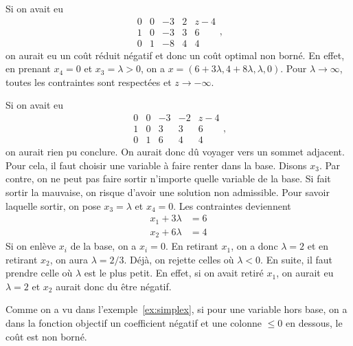 \begin{myexem}
  Si on avait eu
  \[
    \begin{array}{cccc|c}
      0 & 0 & -3 & 2 & z-4\\
      \hline
      1 & 0 & -3 & 3 & 6\\
      0 & 1 & -8 & 4 & 4
    \end{array},
  \]
  on aurait eu un coût réduit négatif et donc un coût optimal non borné.
  En effet, en prenant
  $x_4 = 0$ et $x_3 = \lambda > 0$, on a
  $x = (6 + 3\lambda, 4+8\lambda, \lambda, 0)$.
  Pour $\lambda \to \infty$, toutes les contraintes sont respectées et
  $z \to -\infty$.

  Si on avait eu
  \[
    \begin{array}{cccc|c}
      0 & 0 & -3 & -2 & z-4\\
      \hline
      1 & 0 & 3 & 3 & 6\\
      0 & 1 & 6 & 4 & 4
    \end{array},
  \]
  on aurait rien pu conclure.
  On aurait donc dû voyager vers un sommet adjacent.
  Pour cela, il faut choisir une variable à faire renter dans la base.
  Disons $x_3$.
  Par contre, on ne peut pas faire sortir n'importe quelle variable
  de la base.
  Si fait sortir la mauvaise, on risque d'avoir une solution non admissible.
  Pour savoir laquelle sortir, on pose $x_3 = \lambda$ et $x_4 = 0$.
  Les contraintes deviennent
  \begin{align*}
    x_1 + 3\lambda & = 6\\
    x_2 + 6\lambda & = 4
  \end{align*}
  Si on enlève $x_i$ de la base, on a $x_i = 0$.
  En retirant $x_1$, on a donc $\lambda = 2$ et en retirant $x_2$,
  on aura $\lambda = 2/3$.
  Déjà, on rejette celles où $\lambda < 0$.
  En suite, il faut prendre celle où $\lambda$ est le plus petit.
  En effet, si on avait retiré $x_1$, on aurait eu $\lambda = 2$
  et $x_2$ aurait donc du être négatif.
\end{myexem}

Comme on a vu dans l'exemple~\ref{ex:simplex},
si pour une variable hors base,
on a dans la fonction objectif un coefficient négatif et une colonne $\leq 0$
en dessous, le coût est non borné.


